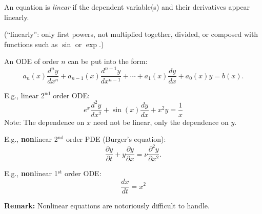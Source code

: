 \documentclass[10pt,aspectratio=169]{beamer}
\begin{document}
\begin{frame}
An equation is \emph{linear} if the dependent variable(s) and their
derivatives appear linearly.

\pause

(``linearly'': only first powers, not multiplied together, divided, or composed
with functions such as $\sin$ or $\exp$.)

\medskip
\pause

An ODE of order $n$ can be put into the form:
\[
a_n(x) \frac{d^n y}{dx^n} + 
a_{n-1}(x) \frac{d^{n-1} y}{dx^{n-1}} + 
\cdots
+
a_{1}(x) \frac{dy}{dx}
+
a_{0}(x) y = b(x) .
\]

\medskip
\pause

E.g., linear 2${}^\text{nd}$ order ODE:
\vspace*{-5pt}
\[
e^x \frac{d^2 y}{dx^2} + 
\sin(x) \frac{d y}{dx} + 
x^2 y
=
\frac{1}{x}
\]
\pause
Note: The dependence on $x$ need not be linear, only the dependence on
$y$.

\medskip
\pause

E.g., \textbf{non}linear 2$^{\text{nd}}$ order PDE (Burger's equation):
\[
\frac{\partial y}{\partial t} + 
y \frac{\partial y}{\partial x} =
\nu \frac{\partial^2 y}{\partial x^2} .
\]

\medskip
\pause

E.g., \textbf{non}linear 1$^{\text{st}}$ order ODE:
\vspace*{-5pt}
\[
\frac{dx}{dt} = x^2
\]

\medskip
\pause

\textbf{Remark:} Nonlinear equations are notoriously difficult to handle.

\end{frame}
\end{document}
